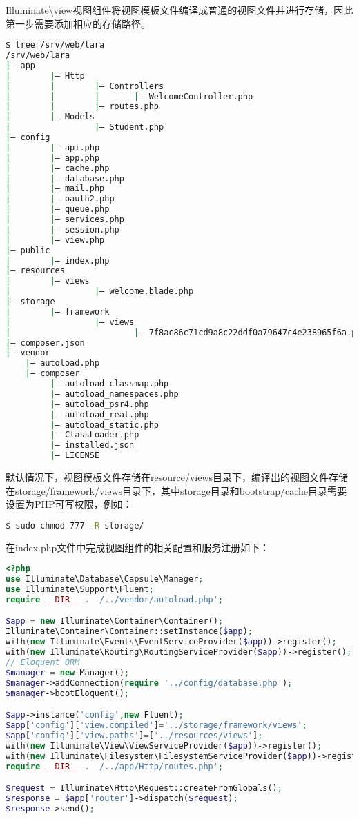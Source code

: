 Illuminate\textbackslash view视图组件将视图模板文件编译成普通的视图文件并进行存储，因此第一步需要添加相应的存储路径。

\begin{lstlisting}[language=bash]
$ tree /srv/web/lara
/srv/web/lara
|— app
|        |— Http
|        |        |— Controllers
|        |        |       |— WelcomeController.php 
|        |        |— routes.php
|        |— Models
|                 |— Student.php
|— config
|        |— api.php
|        |— app.php
|        |— cache.php
|        |— database.php
|        |— mail.php
|        |— oauth2.php
|        |— queue.php
|        |— services.php
|        |— session.php
|        |— view.php
|— public
|        |— index.php
|— resources
|        |— views
|                 |— welcome.blade.php
|— storage
|        |— framework
|                 |— views
|                         |— 7f8ac86c71cd9a8c22ddf0a79647c4e238965f6a.php
|— composer.json
|— vendor
    |— autoload.php
    |— composer
         |— autoload_classmap.php
         |— autoload_namespaces.php
         |— autoload_psr4.php
         |— autoload_real.php
         |— autoload_static.php
         |— ClassLoader.php
         |— installed.json
         |— LICENSE
\end{lstlisting}

默认情况下，视图模板文件存储在resource/views目录下，编译出的视图文件存储在storage/framework/views目录下，其中storage目录和bootstrap/cache目录需要设置为PHP可写权限，例如：

\begin{lstlisting}[language=bash]
$ sudo chmod 777 -R storage/
\end{lstlisting}




在index.php文件中完成视图组件的相关配置和服务注册如下：


\begin{lstlisting}[language=PHP]
<?php
use Illuminate\Database\Capsule\Manager;
use Illuminate\Support\Fluent;
require __DIR__ . '/../vendor/autoload.php';

$app = new Illuminate\Container\Container();
Illuminate\Container\Container::setInstance($app);
with(new Illuminate\Events\EventServiceProvider($app))->register();
with(new Illuminate\Routing\RoutingServiceProvider($app))->register();
// Eloquent ORM
$manager = new Manager();
$manager->addConnection(require '../config/database.php');
$manager->bootEloquent();

$app->instance('config',new Fluent);
$app['config']['view.compiled']='../storage/framework/views';
$app['config']['view.paths']=['../resources/views'];
with(new Illuminate\View\ViewServiceProvider($app))->register();
with(new Illuminate\Filesystem\FilesystemServiceProvider($app))->register();
require __DIR__ . '/../app/Http/routes.php';

$request = Illuminate\Http\Request::createFromGlobals();
$response = $app['router']->dispatch($request);
$response->send();
\end{lstlisting}


